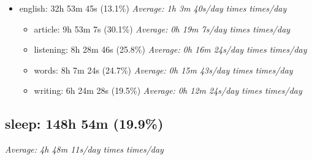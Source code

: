 \documentclass[12pt]{extarticle}
\begin{document}
\begin{itemize}[topsep=0pt, itemsep=-0.5ex]
\begin{itemize}[topsep=0pt, itemsep=-0.5ex]
\begin{itemize}[topsep=0pt, itemsep=-0.5ex]
\end{itemize}
    \item data-structure: 15h 50m 21s (41.3\%)
        \textit{Average: 0h 30m 39s/day  times  times/day}\par
\begin{itemize}[topsep=0pt, itemsep=-0.5ex]
    \item trees: 11h 14m 46s (71.0\%)
        \textit{Average: 0h 21m 46s/day  times  times/day}\par
    \item graphs: 4h 35m 35s (29.0\%)
        \textit{Average: 0h 8m 53s/day  times  times/day}\par
\end{itemize}
\end{itemize}
    \item english: 32h 53m 45s (13.1\%)
        \textit{Average: 1h 3m 40s/day  times  times/day}\par
\begin{itemize}[topsep=0pt, itemsep=-0.5ex]
    \item article: 9h 53m 7s (30.1\%)
        \textit{Average: 0h 19m 7s/day  times  times/day}\par
    \item listening: 8h 28m 46s (25.8\%)
        \textit{Average: 0h 16m 24s/day  times  times/day}\par
    \item words: 8h 7m 24s (24.7\%)
        \textit{Average: 0h 15m 43s/day  times  times/day}\par
    \item writing: 6h 24m 28s (19.5\%)
        \textit{Average: 0h 12m 24s/day  times  times/day}\par
\end{itemize}
\end{itemize}
{\fontsize{16}{19.2}\selectfont\subsection*{sleep: 148h 54m (19.9\%)}}
\textit{Average: 4h 48m 11s/day  times  times/day}\par
\end{document}
